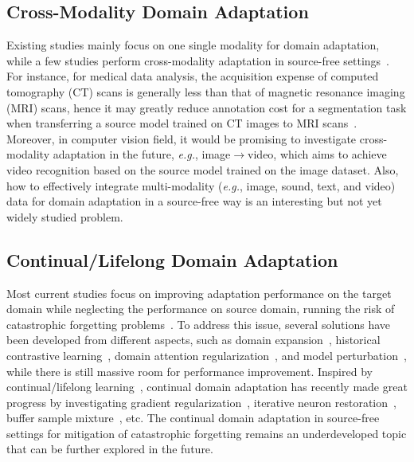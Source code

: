 \documentclass[10pt,journal,compsoc]{IEEEtran}
\def\eg{{\em e.g.}}
\begin{document}
\subsection{Cross-Modality Domain Adaptation}
Existing studies mainly focus on one single modality for domain adaptation, while a few studies perform cross-modality adaptation in source-free settings~\cite{hong2022source, ahmed2022cross}. 
For instance, for medical data analysis, the acquisition expense of computed tomography (CT) scans is generally less than that of magnetic resonance imaging (MRI) scans, hence it may greatly reduce annotation cost for a segmentation task when transferring a source model trained on CT images to MRI scans~\cite{hong2022source}. 
Moreover, in computer vision field, it would be promising to investigate cross-modality adaptation in the future, \eg, image$\rightarrow$video, which aims to achieve video recognition based on the source model trained on the image dataset. 
Also, how to effectively integrate multi-modality (\eg, image, sound, text, and video) data for domain adaptation in a source-free way is an interesting but %
not yet widely studied problem.


\subsection{Continual/Lifelong Domain Adaptation}
Most current studies focus on improving adaptation performance on the target domain while neglecting the performance on source domain, running the risk of catastrophic forgetting problems~\cite{kemker2018measuring}.
To address this issue, several solutions have been developed from different aspects, such as domain expansion~\cite{zhang2020unsupervised}, historical contrastive learning~\cite{huang2021model}, domain attention regularization~\cite{yang2021generalized}, and model perturbation~\cite{jing2022variational}, while there is still massive room for performance improvement. 
Inspired by continual/lifelong learning~\cite{kirkpatrick2017overcoming, li2017learning, lopez2017gradient, de2021continual}, continual domain adaptation has recently made great progress by investigating gradient regularization~\cite{tang2021gradient}, iterative neuron restoration~\cite{wang2022continual}, buffer sample mixture~\cite{taufique2021conda}, etc. 
The continual domain adaptation in source-free settings for mitigation of catastrophic forgetting remains an underdeveloped topic that can be further explored in the future.
\end{document}
